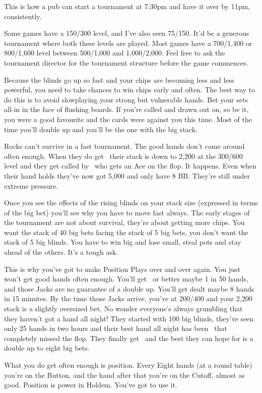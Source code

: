 This is how a pub can start a tournament at 7:30pm and have it over
by 11pm, consistently.

Some games have a 150/300 level, and I've also seen 75/150. It'd be
a generous tournament where both these levels are played. Most games
have a 700/1,400 or 800/1,600 level between 500/1,000 and 1,000/2,000. Feel
free to ask the tournament director for the tournament structure before
the game commences.

Because the blinds go up so fast and your chips are becoming less and
less powerful, you need to take chances to win chips early and often.
The best way to do this is to avoid slowplaying your strong but
vulnerable hands. Bet your sets all-in in the face of flushing boards.
If you're called and drawn out on, so be it, you were a good favourite
and the cards were against you this time. Most of the time you'll double
up and you'll be the one with the big stack.

Rocks can't survive in a fast tournament. The good hands don't come
around often enough. When they do get \Ks\Kc\ their stack is down to 2,200 at
the 300/600 level and they get called by \Ad\Qd\ who gets an Ace on the flop.
It happens. Even when their hand holds they've now got 5,000 and only have
8 BB. They're still under extreme pressure.

Once you see the effects of the rising blinds on your stack size
(expressed in terms of the big bet) you'll see why you have to move
fast always. The early stages of the tournament are not about survival,
they're about getting more chips. You want the stack of 40 big bets facing
the stack of 5 big bets, you don't want the stack of 5 big blinds. You
have to win big and lose small, steal pots and stay ahead of the others.
It's a tough ask.

This is why you've got to make Position Plays over and over again.
You just won't get good hands often enough. You'll get \Js\Jc\ or better
maybe 1 in 50 hands, and those Jacks are no guarantee of a double up.
You'll get dealt maybe 8 hands in 15 minutes.
By the time those Jacks arrive, you've at 200/400 and your 2,200 stack is
a slightly oversized bet. No wonder everyone's always grumbling that
they haven't got a hand all night! They started with 100 big blinds,
they've seen only 25 hands in two hours and their best hand all
night has been \Jd\nined\ that completely missed the flop.
They finally get \Js\Jc\ and the best they can hope for is a double
up to eight big bets.

What you do get often enough is position. Every Eight hands (at a
round table) you're on the Button, and the hand after that you're on
the Cutoff, almost as good. Position is power in Holdem. You've got to
use it.


